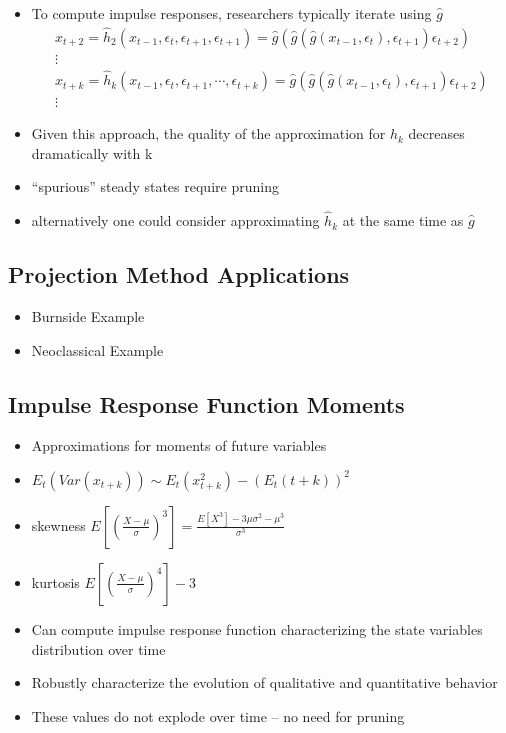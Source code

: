 \documentclass[12pt]{article}
\begin{document}
  \begin{itemize}
  \item To compute impulse responses, researchers typically iterate using $\hat{g}$
\begin{gather*}
x_{t+2}=  \hat{h}_2(x_{t-1},\epsilon_t,\epsilon_{t+1},\epsilon_{t+1})= \hat{g}(\hat{g}(\hat{g}(x_{t-1},\epsilon_t), \epsilon_{t+1}) \epsilon_{t+2})\\
\vdots \\
x_{t+k}=  \hat{h}_k(x_{t-1},\epsilon_t,\epsilon_{t+1},\cdots,\epsilon_{t+k})= \hat{g}(\hat{g}(\hat{g}(x_{t-1},\epsilon_t), \epsilon_{t+1}) \epsilon_{t+2})\\
\vdots
\end{gather*}
  \item Given this approach, the quality of the approximation for $h_k$ decreases dramatically with k
  \item ``spurious'' steady states require pruning
  \item alternatively one could consider approximating $\hat{h}_k$ at the same time as $\hat{g}$
  \end{itemize}

\subsection{Projection Method Applications}
\label{sec:proj-meth-appl}

\begin{itemize}
\item Burnside Example
\item Neoclassical Example
\end{itemize}


\subsection{Impulse Response Function Moments}
\label{sec:impulse-resp-funct}


  \begin{itemize}
\item Approximations for moments of future variables
\item $E_t(Var(x_{t+k})) \sim E_t(x_{t+k}^2)   - (E_t({t+k}))^2$
\item skewness
$E\left [ \left ( \frac{X-\mu}{\sigma} \right )^3 \right ] = \frac{E[X^3] - 3 \mu \sigma^2 - \mu^3}{\sigma^3}$
\item kurtosis
$E\left [ \left ( \frac{X-\mu}{\sigma} \right )^4 \right ] -3$
\item Can compute impulse response function characterizing the state variables 
distribution over time
\item Robustly characterize the evolution of qualitative and quantitative behavior
\item These values do not explode over time -- no need for pruning

  \end{itemize}
\end{document}
